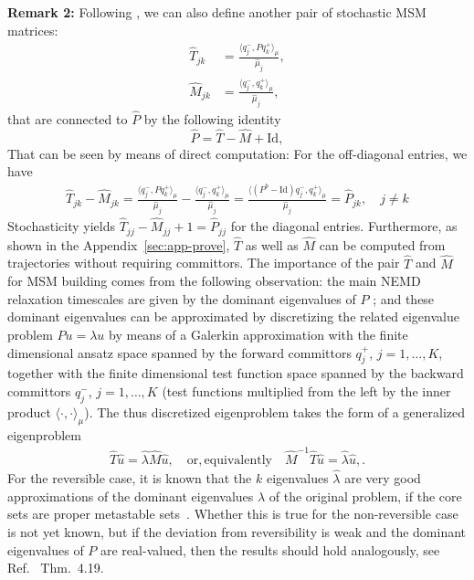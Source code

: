 \documentclass[journal=jctcce,manuscript=article]{achemso}
\newcommand{\fwd}[0]{+}
\newcommand{\bwd}[0]{-}
\newcommand{\id}{\mathrm{Id}}
\begin{document}
\textbf{Remark 2:}
Following \cite{A19-31}, we can also define another pair of stochastic MSM matrices: 
\begin{align}\label{eq:msm-ht-1}
  \hat T_{jk} &= \frac{\langle q_j^\bwd, P q_k^\fwd \rangle_\mu}{\hat \mu_j},\\\label{eq:msm-hm-1}
  \hat M_{jk} &= \frac{\langle q_j^\bwd, q_k^\fwd \rangle_\mu}{\hat \mu_j},
\end{align}
that are connected to $\hat{P}$ by the following identity
\[
\hat{P}=\hat{T}-\hat{M}+\id,
\]
That can be seen by means of direct computation: For the off-diagonal entries, we have
\begin{align}\label{eq:msm-tmp26}
  \hat T_{jk} - \hat M_{jk}
  = \frac{\langle q_j^\bwd, P q_k^\fwd \rangle_\mu}{\hat \mu_j}
  - \frac{\langle q_j^\bwd,  q_k^\fwd \rangle_\mu}{\hat \mu_j}
  = \frac{\langle (P^b - \id) q_j^\bwd, q_k^\fwd \rangle_\mu}{\hat \mu_j}
  = \hat P_{jk}, \quad j\neq k
\end{align}
Stochasticity yields
$\hat T_{jj} - \hat M_{jj} + 1 = \hat P_{jj}$ for the diagonal entries.  Furthermore, as shown in the Appendix~\ref{sec:app-prove}, $\hat{T}$ as well as $\hat{M}$ can be computed from trajectories without requiring committors. 
The importance of the pair $\hat{T}$ and $\hat{M}$ for MSM building comes from the following observation: the main NEMD relaxation timescales are given by the dominant eigenvalues of $P$ \cite{A19-31, A19-1};
and these dominant eigenvalues can be approximated by discretizing the related eigenvalue problem $Pu=\lambda u$ by means of a Galerkin approximation with the finite dimensional ansatz space 
spanned by the forward committors $q^+_j$, $j=1,\ldots,K$, together  with the finite dimensional test function space spanned by the backward committors $q^-_j$, $j=1,\ldots,K$ (test functions multiplied from the left by the inner product $\langle\cdot,\cdot\rangle_\mu$). The thus discretized eigenproblem takes the form  of a generalized eigenproblem
\begin{align}
  \label{eq:msm-gen-ev}
\hat{T}\hat{u}=\hat{\lambda}\hat{M}\hat{u},\quad\mathrm{or, equivalently}\quad \hat{M}^{-1}\hat{T}\hat{u}=\hat{\lambda}\hat{u},.  
\end{align}
For the reversible case, it is known that the $k$ eigenvalues $\hat{\lambda}$ are very good approximations of the dominant eigenvalues $\lambda$ of the original problem, if the core sets are proper metastable sets~\cite{Eigenvalues}. Whether this is true for the non-reversible case is not yet known, but if the deviation from reversibility is weak and the dominant eigenvalues of $P$ are real-valued, then the results should hold analogously, see Ref.~\cite{A19-31} Thm.~4.19. 
\end{document}
